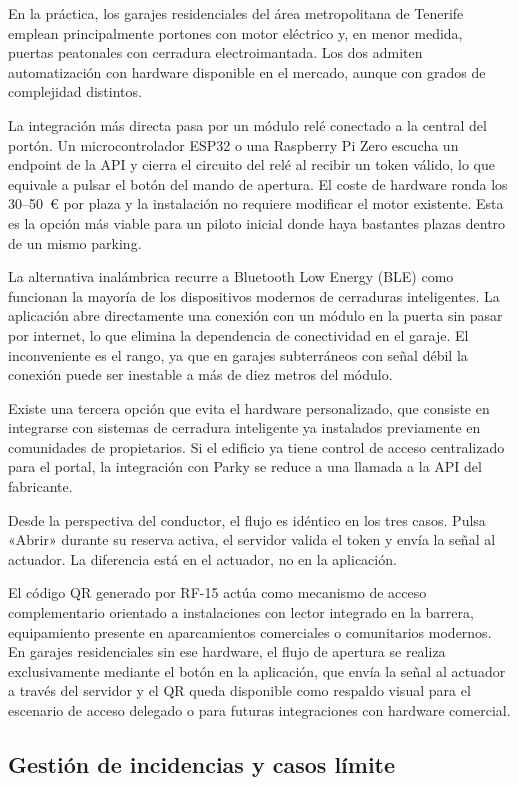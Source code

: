 En la práctica, los garajes residenciales del área metropolitana de Tenerife emplean principalmente portones con motor eléctrico y, en menor medida, puertas peatonales con cerradura electroimantada. Los dos admiten automatización con hardware disponible en el mercado, aunque con grados de complejidad distintos.

La integración más directa pasa por un módulo relé conectado a la central del portón. Un microcontrolador ESP32 o una Raspberry Pi Zero escucha un endpoint de la API y cierra el circuito del relé al recibir un token válido, lo que equivale a pulsar el botón del mando de apertura. El coste de hardware ronda los 30--50~€ por plaza y la instalación no requiere modificar el motor existente. Esta es la opción más viable para un piloto inicial donde haya bastantes plazas dentro de un mismo parking.

La alternativa inalámbrica recurre a Bluetooth Low Energy (BLE) como funcionan la mayoría de los dispositivos modernos de cerraduras inteligentes. La aplicación abre directamente una conexión con un módulo en la puerta sin pasar por internet, lo que elimina la dependencia de conectividad en el garaje. El inconveniente es el rango, ya que en garajes subterráneos con señal débil la conexión puede ser inestable a más de diez metros del módulo.

Existe una tercera opción que evita el hardware personalizado, que consiste en integrarse con sistemas de cerradura inteligente ya instalados previamente en comunidades de
propietarios. Si el edificio ya tiene control de acceso centralizado para el portal, la integración con Parky se reduce a una llamada a la API del fabricante.

Desde la perspectiva del conductor, el flujo es idéntico en los tres casos. Pulsa «Abrir» durante su reserva activa, el servidor valida el token y envía la señal al actuador. La diferencia está en el actuador, no en la aplicación.

El código QR generado por RF-15 actúa como mecanismo de acceso complementario orientado a instalaciones con lector integrado en la barrera, equipamiento presente en aparcamientos comerciales o comunitarios modernos. En garajes residenciales sin ese hardware, el flujo de apertura se realiza exclusivamente mediante el botón en la aplicación, que envía la señal al actuador a través del servidor y el QR queda disponible como respaldo visual para el escenario de acceso delegado o para futuras integraciones con hardware comercial.

\subsection{Gestión de incidencias y casos límite}
\label{subsec:incidencias_smartaccess}

